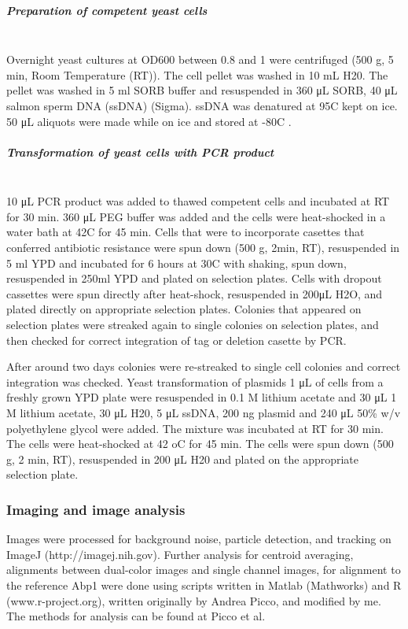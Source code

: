 \subparagraph{Preparation of competent yeast cells} 
\mbox{}\\
Overnight yeast cultures at OD600 between 0.8 and 1 were centrifuged (500 g, 5 min, Room Temperature (RT)). The cell
pellet was washed in 10 mL H20. The pellet was washed in 5 ml SORB buffer and resuspended in 360 μL SORB, 40 μL salmon sperm DNA (ssDNA) (Sigma). ssDNA was denatured at 95C kept on ice. 50 μL aliquots were made while on ice and stored at -80C .

\subparagraph{Transformation of yeast cells with PCR product} 
\mbox{}\\
10 μL PCR product was added to thawed competent cells and incubated at RT for 30 min. 360 μL PEG buffer was added and the cells were heat-shocked in a water bath at 42C for 45 min. Cells that were to incorporate casettes that conferred antibiotic resistance were spun down (500 g, 2min, RT), resuspended in 5 ml YPD and incubated for 6 hours at 30C with shaking, spun down, resuspended in 250ml YPD and plated on selection plates. Cells with dropout cassettes were spun directly after heat-shock, resuspended in 200μL H2O, and plated directly on appropriate selection plates. Colonies that appeared on selection plates were streaked again to single colonies on selection plates, and then checked for correct integration of tag or deletion casette by PCR.

After around two days colonies were re-streaked to single cell colonies and correct integration was checked.
Yeast transformation of plasmids
1 μL of cells from a freshly grown YPD plate were resuspended in 0.1 M lithium acetate and 30 μL 1 M lithium acetate, 30 μL H20, 5 μL ssDNA, 200 ng plasmid and 240 μL 50\% w/v polyethylene glycol were added. The mixture was incubated at RT for 30 min. The cells were heat-shocked at 42 oC for 45 min. The cells were spun down (500 g, 2 min, RT), resuspended in 200 μL H20 and plated on the appropriate selection plate.

\subsubsection{Imaging and image analysis }
Images were processed for background noise, particle detection, and tracking on ImageJ (http://imagej.nih.gov). Further analysis for centroid averaging, alignments between dual-color images and single channel images, for alignment to the reference Abp1 were done using scripts written in Matlab (Mathworks) and R (www.r-project.org), written originally by Andrea Picco, and modified by me. The methods for analysis can be found at Picco et al. 

